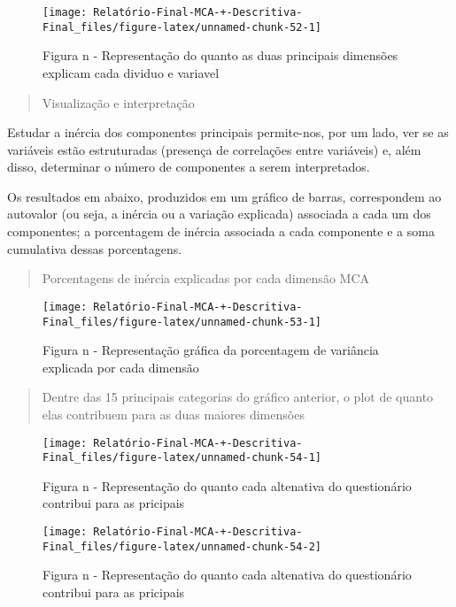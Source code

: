 \documentclass[
]{article}
\begin{document}
\begin{figure}

{\centering \texttt{[image: Relatório-Final-MCA-+-Descritiva-Final\_files/figure-latex/unnamed-chunk-52-1]} 

}

\caption{Figura n - Representação do quanto as duas principais dimensões explicam cada dividuo e variavel}\label{fig:unnamed-chunk-52}
\end{figure}

\begin{quote}
Visualização e interpretação
\end{quote}

Estudar a inércia dos componentes principais permite-nos, por um lado,
ver se as variáveis estão estruturadas (presença de correlações entre
variáveis) e, além disso, determinar o número de componentes a serem
interpretados.

Os resultados em abaixo, produzidos em um gráfico de barras,
correspondem ao autovalor (ou seja, a inércia ou a variação explicada)
associada a cada um dos componentes; a porcentagem de inércia associada
a cada componente e a soma cumulativa dessas porcentagens.

\begin{quote}
Porcentagens de inércia explicadas por cada dimensão MCA
\end{quote}

\begin{figure}

{\centering \texttt{[image: Relatório-Final-MCA-+-Descritiva-Final\_files/figure-latex/unnamed-chunk-53-1]} 

}

\caption{Figura n - Representação gráfica da porcentagem de variância explicada por cada dimensão}\label{fig:unnamed-chunk-53}
\end{figure}

\begin{quote}
Dentre das 15 principais categorias do gráfico anterior, o plot de
quanto elas contribuem para as duas maiores dimensões
\end{quote}

\begin{figure}

{\centering \texttt{[image: Relatório-Final-MCA-+-Descritiva-Final\_files/figure-latex/unnamed-chunk-54-1]} 

}

\caption{Figura n - Representação do quanto cada altenativa do questionário contribui para as pricipais}\label{fig:unnamed-chunk-54-1}
\end{figure}
\begin{figure}

{\centering \texttt{[image: Relatório-Final-MCA-+-Descritiva-Final\_files/figure-latex/unnamed-chunk-54-2]} 

}

\caption{Figura n - Representação do quanto cada altenativa do questionário contribui para as pricipais}\label{fig:unnamed-chunk-54-2}
\end{figure}
\end{document}
